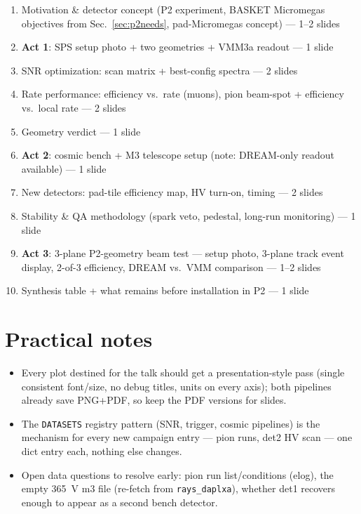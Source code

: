 \documentclass[11pt,a4paper]{article}
\newcommand{\code}[1]{\texttt{#1}}
\begin{document}
\begin{enumerate}[itemsep=1pt]
  \item Motivation \& detector concept (P2 experiment, BASKET Micromegas
    objectives from Sec.~\ref{sec:p2needs}, pad-Micromegas concept) ---
    1--2 slides
  \item \textbf{Act 1}: SPS setup photo + two geometries + VMM3a readout --- 1 slide
  \item SNR optimization: scan matrix + best-config spectra --- 2 slides
  \item Rate performance: efficiency vs.\ rate (muons), pion beam-spot +
    efficiency vs.\ local rate --- 2 slides
  \item Geometry verdict --- 1 slide
  \item \textbf{Act 2}: cosmic bench + M3 telescope setup (note: DREAM-only
    readout available) --- 1 slide
  \item New detectors: pad-tile efficiency map, HV turn-on, timing --- 2 slides
  \item Stability \& QA methodology (spark veto, pedestal, long-run
    monitoring) --- 1 slide
  \item \textbf{Act 3}: 3-plane P2-geometry beam test --- setup photo,
    3-plane track event display, 2-of-3 efficiency, DREAM vs.\ VMM
    comparison --- 1--2 slides
  \item Synthesis table + what remains before installation in P2 --- 1 slide
\end{enumerate}

\section{Practical notes}

\begin{itemize}[itemsep=1pt]
  \item Every plot destined for the talk should get a presentation-style pass
    (single consistent font/size, no debug titles, units on every axis); both
    pipelines already save PNG+PDF, so keep the PDF versions for slides.
  \item The \code{DATASETS} registry pattern (SNR, trigger, cosmic pipelines)
    is the mechanism for every new campaign entry --- pion runs, det2 HV scan
    --- one dict entry each, nothing else changes.
  \item Open data questions to resolve early: pion run list/conditions (elog),
    the empty 365~V m3 file (re-fetch from \code{rays\_daplxa}), whether det1
    recovers enough to appear as a second bench detector.
\end{itemize}
\end{document}
